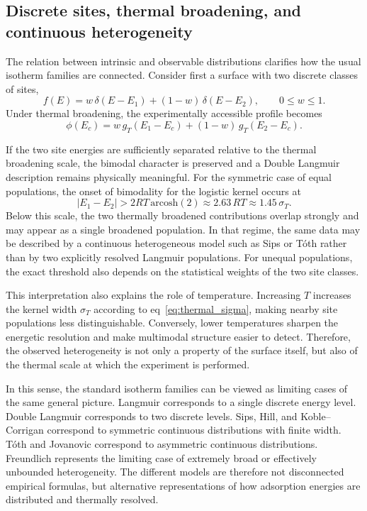 \documentclass[journal=jacsat,manuscript=article]{achemso}
\begin{document}
	\subsection{Discrete sites, thermal broadening, and continuous heterogeneity}
	\label{sec:energy_examples}
	
	The relation between intrinsic and observable distributions clarifies how the usual isotherm families are connected. Consider first a surface with two discrete classes of sites,
	\begin{equation}
		f(E)
		=
		w\,\delta(E-E_1)
		+
		(1-w)\,\delta(E-E_2),
		\qquad 0 \leq w \leq 1.
		\label{eq:two_site_distribution}
	\end{equation}
	Under thermal broadening, the experimentally accessible profile becomes
	\begin{equation}
		\phi(E_c)
		=
		w\, g_T(E_1-E_c)
		+
		(1-w)\, g_T(E_2-E_c).
		\label{eq:two_site_broadened}
	\end{equation}
	
	If the two site energies are sufficiently separated relative to the thermal broadening scale, the bimodal character is preserved and a Double Langmuir description remains physically meaningful. For the symmetric case of equal populations, the onset of bimodality for the logistic kernel occurs at
	\begin{equation}
		|E_1-E_2| > 2RT\,\mathrm{arcosh}(2) \approx 2.63\,RT \approx 1.45\,\sigma_T.
	\end{equation}
	Below this scale, the two thermally broadened contributions overlap strongly and may appear as a single broadened population. In that regime, the same data may be described by a continuous heterogeneous model such as Sips or T\'{o}th rather than by two explicitly resolved Langmuir populations. For unequal populations, the exact threshold also depends on the statistical weights of the two site classes.
	
	This interpretation also explains the role of temperature. Increasing $T$ increases the kernel width $\sigma_T$ according to eq~\eqref{eq:thermal_sigma}, making nearby site populations less distinguishable. Conversely, lower temperatures sharpen the energetic resolution and make multimodal structure easier to detect. Therefore, the observed heterogeneity is not only a property of the surface itself, but also of the thermal scale at which the experiment is performed.
	
	In this sense, the standard isotherm families can be viewed as limiting cases of the same general picture. Langmuir corresponds to a single discrete energy level. Double Langmuir corresponds to two discrete levels. Sips, Hill, and Koble--Corrigan correspond to symmetric continuous distributions with finite width. T\'{o}th and Jovanovic correspond to asymmetric continuous distributions. Freundlich represents the limiting case of extremely broad or effectively unbounded heterogeneity. The different models are therefore not disconnected empirical formulas, but alternative representations of how adsorption energies are distributed and thermally resolved.
	
\end{document}
